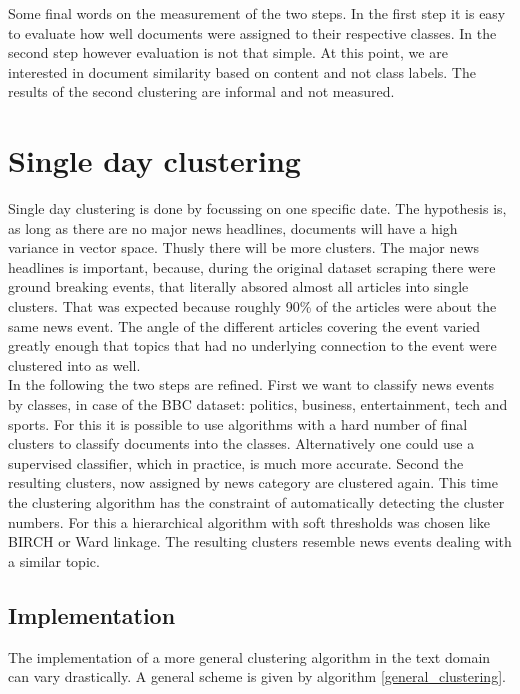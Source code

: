 Some final words on the measurement of the two steps. In the first step it is easy to evaluate how well documents were assigned to their respective classes. In the second step however evaluation is not that simple. At this point, we are interested in document similarity based on content and not class labels. The results of the second clustering are informal and not measured.

\section{Single day clustering}

Single day clustering is done by focussing on one specific date. The hypothesis is, as long as there are no major news headlines, documents will have a high variance in vector space. Thusly there will be more clusters. The major news headlines is important, because, during the original dataset scraping there were ground breaking events, that literally absored almost all articles into single clusters. That was expected because roughly 90\% of the articles were about the same news event. The angle of the different articles covering the event varied greatly enough that topics that had no underlying connection to the event were clustered into as well.\\

In the following the two steps are refined. First we want to classify news events by classes, in case of the BBC dataset: politics, business, entertainment, tech and sports. For this it is possible to use algorithms with a hard number of final clusters to classify documents into the classes. Alternatively one could use a supervised classifier, which in practice, is much more accurate. Second the resulting clusters, now assigned by news category are clustered again. This time the clustering algorithm has the constraint of automatically detecting the cluster numbers. For this a hierarchical algorithm with soft thresholds was chosen like BIRCH or Ward linkage. The resulting clusters resemble news events dealing with a similar topic.

  \subsection{Implementation}
  The implementation of a more general clustering algorithm in the text domain can vary drastically. A general scheme is given by algorithm \ref{general_clustering}.

